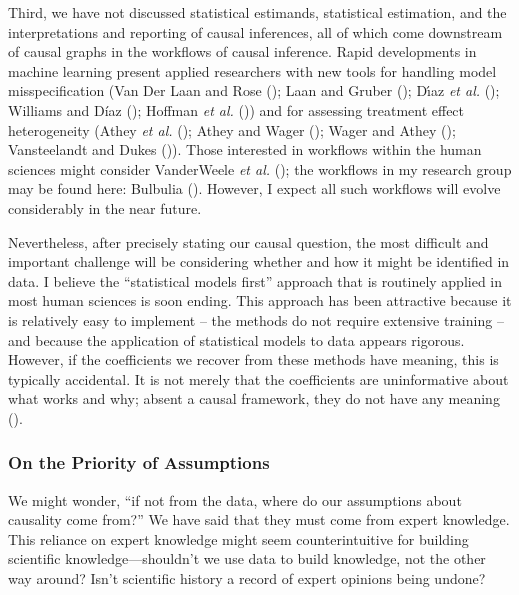 \documentclass[
  single column]{article}
\begin{document}
Third, we have not discussed statistical estimands, statistical
estimation, and the interpretations and reporting of causal inferences,
all of which come downstream of causal graphs in the workflows of causal
inference. Rapid developments in machine learning present applied
researchers with new tools for handling model misspecification (Van Der
Laan and Rose (); Laan and Gruber
(); Dı́az \emph{et al.}
(); Williams and Díaz
(); Hoffman \emph{et al.}
()) and for assessing treatment effect
heterogeneity (Athey \emph{et al.} ();
Athey and Wager (); Wager and Athey
(); Vansteelandt and Dukes
()). Those interested in workflows
within the human sciences might consider VanderWeele \emph{et al.}
(); the workflows in my research
group may be found here: Bulbulia
(). However, I expect all such
workflows will evolve considerably in the near future.

Nevertheless, after precisely stating our causal question, the most
difficult and important challenge will be considering whether and how it
might be identified in data. I believe the ``statistical models first''
approach that is routinely applied in most human sciences is soon
ending. This approach has been attractive because it is relatively easy
to implement -- the methods do not require extensive training -- and
because the application of statistical models to data appears rigorous.
However, if the coefficients we recover from these methods have meaning,
this is typically accidental. It is not merely that the coefficients are
uninformative about what works and why; absent a causal framework, they
do not have any meaning ().

\subsubsection{On the Priority of
Assumptions}\label{on-the-priority-of-assumptions}

We might wonder, ``if not from the data, where do our assumptions about
causality come from?'' We have said that they must come from expert
knowledge. This reliance on expert knowledge might seem counterintuitive
for building scientific knowledge---shouldn't we use data to build
knowledge, not the other way around? Isn't scientific history a record
of expert opinions being undone?
\end{document}

